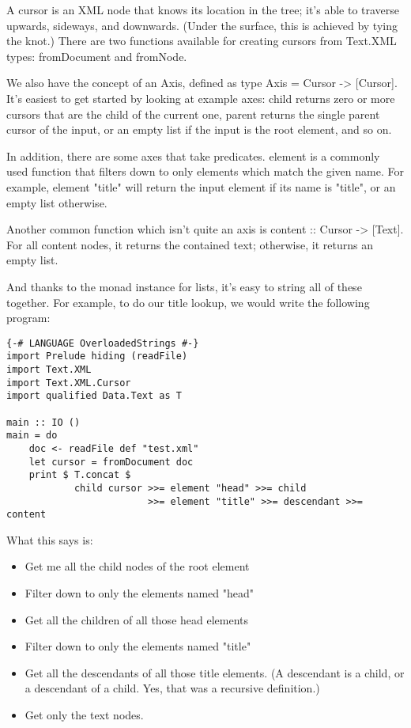 A cursor is an XML node that knows its location in the tree; it's able to traverse upwards, sideways, and downwards. (Under the surface, this is achieved by tying the knot.) There are two functions available for creating cursors from Text.XML types: fromDocument and fromNode.

We also have the concept of an Axis, defined as type Axis = Cursor -> [Cursor]. It's easiest to get started by looking at example axes: child returns zero or more cursors that are the child of the current one, parent returns the single parent cursor of the input, or an empty list if the input is the root element,
and so on.

In addition, there are some axes that take predicates. element is a commonly used function that filters down to only elements which match the given name. For example, element "title" will return the input element if its name is "title", or an empty list otherwise.

Another common function which isn't quite an axis is content :: Cursor -> [Text]. For all content nodes, it returns the contained text; otherwise, it returns an
empty list.

And thanks to the monad instance for lists, it's easy to string all of these together. For example, to do our title lookup, we would write the following program:

\begin{lstlisting}
{-# LANGUAGE OverloadedStrings #-}
import Prelude hiding (readFile)
import Text.XML
import Text.XML.Cursor
import qualified Data.Text as T

main :: IO ()
main = do
    doc <- readFile def "test.xml"
    let cursor = fromDocument doc
    print $ T.concat $
            child cursor >>= element "head" >>= child
                         >>= element "title" >>= descendant >>= content
\end{lstlisting}

What this says is:

\begin{itemize}
\item Get me all the child nodes of the root element
\item Filter down to only the elements named "head"
\item Get all the children of all those head elements
\item Filter down to only the elements named "title"
\item Get all the descendants of all those title elements. (A descendant is a child, or a descendant of a child. Yes, that was a recursive definition.)
\item Get only the text nodes.
\end{itemize}

